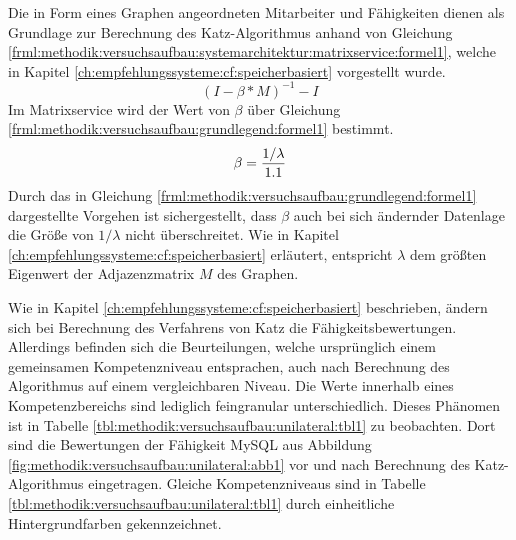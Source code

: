 Die in Form eines Graphen angeordneten Mitarbeiter und Fähigkeiten dienen als Grundlage zur Berechnung des Katz-Algorithmus anhand von Gleichung \ref{frml:methodik:versuchsaufbau:systemarchitektur:matrixservice:formel1}, welche in Kapitel \ref{ch:empfehlungssysteme:cf:speicherbasiert} vorgestellt wurde.
\begin{equation}
	(I - \beta * M)^{-1} - I
	\label{frml:methodik:versuchsaufbau:systemarchitektur:matrixservice:formel1}
\end{equation}
Im Matrixservice wird der Wert von $\beta$ über Gleichung \ref{frml:methodik:versuchsaufbau:grundlegend:formel1} bestimmt.
\begin{equation}
	\beta = \frac{1/\lambda}{1.1}
	\label{frml:methodik:versuchsaufbau:grundlegend:formel1}
\end{equation}
Durch das in Gleichung \ref{frml:methodik:versuchsaufbau:grundlegend:formel1} dargestellte Vorgehen ist sichergestellt, dass $\beta$ auch bei sich ändernder Datenlage die Größe von $1/\lambda$ nicht überschreitet. Wie in Kapitel \ref{ch:empfehlungssysteme:cf:speicherbasiert} erläutert, entspricht $\lambda$ dem größten Eigenwert der Adjazenzmatrix $M$ des Graphen.

Wie in Kapitel \ref{ch:empfehlungssysteme:cf:speicherbasiert} beschrieben, ändern sich bei Berechnung des Verfahrens von Katz die Fähigkeitsbewertungen. Allerdings befinden sich die Beurteilungen, welche ursprünglich einem gemeinsamen Kompetenzniveau entsprachen, auch nach Berechnung des Algorithmus auf einem vergleichbaren Niveau. Die Werte innerhalb eines Kompetenzbereichs sind lediglich feingranular unterschiedlich. Dieses Phänomen ist in Tabelle \ref{tbl:methodik:versuchsaufbau:unilateral:tbl1} zu beobachten. Dort sind die Bewertungen der Fähigkeit MySQL aus Abbildung \ref{fig:methodik:versuchsaufbau:unilateral:abb1} vor und nach Berechnung des Katz-Algorithmus eingetragen. Gleiche Kompetenzniveaus sind in Tabelle \ref{tbl:methodik:versuchsaufbau:unilateral:tbl1} durch einheitliche Hintergrundfarben gekennzeichnet.

